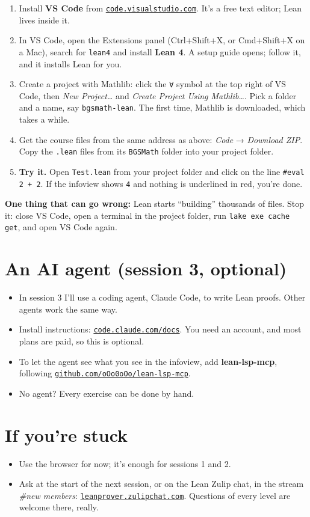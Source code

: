 \documentclass[11pt]{article}
\begin{document}
\begin{enumerate}
\item Install \textbf{VS Code} from \href{https://code.visualstudio.com}{\texttt{code.visualstudio.com}}. It's a free text editor; Lean lives inside it.
\item In VS Code, open the Extensions panel (Ctrl+Shift+X, or Cmd+Shift+X on a Mac), search for \texttt{lean4} and install \textbf{Lean 4}. A setup guide opens; follow it, and it installs Lean for you.
\item Create a project with Mathlib: click the \texttt{∀} symbol at the top right of VS Code, then \emph{New Project…} and \emph{Create Project Using Mathlib…}. Pick a folder and a name, say \texttt{bgsmath-lean}. The first time, Mathlib is downloaded, which takes a while.
\item Get the course files from the same address as above: \emph{Code} → \emph{Download ZIP}. Copy the \texttt{.lean} files from its \texttt{BGSMath} folder into your project folder.
\item \textbf{Try it.} Open \texttt{Test.lean} from your project folder and click on the line \texttt{\#eval 2 + 2}. If the infoview shows \texttt{4} and nothing is underlined in red, you're done.
\end{enumerate}

\textbf{One thing that can go wrong:} Lean starts ``building'' thousands of files. Stop it: close VS Code, open a terminal in the project folder, run \texttt{lake exe cache get}, and open VS Code again.

\section{An AI agent (session 3, optional)}

\begin{itemize}
\item In session 3 I'll use a coding agent, Claude Code, to write Lean proofs. Other agents work the same way.
\item Install instructions: \href{https://code.claude.com/docs}{\texttt{code.claude.com/docs}}. You need an account, and most plans are paid, so this is optional.
\item To let the agent see what you see in the infoview, add \textbf{lean-lsp-mcp}, following \href{https://github.com/oOo0oOo/lean-lsp-mcp}{\texttt{github.com/oOo0oOo/lean-lsp-mcp}}.
\item No agent? Every exercise can be done by hand.
\end{itemize}

\section{If you're stuck}

\begin{itemize}
\item Use the browser for now; it's enough for sessions 1 and 2.
\item Ask at the start of the next session, or on the Lean Zulip chat, in the stream \emph{\#new members}: \href{https://leanprover.zulipchat.com}{\texttt{leanprover.zulipchat.com}}. Questions of every level are welcome there, really.
\end{itemize}
\end{document}
